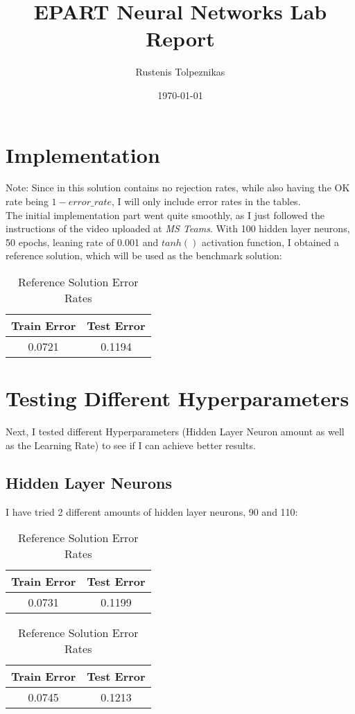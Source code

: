 \documentclass[
  a4paper,            %
  DIV=10,             %
  oneside,            %
  BCOR=5mm,           %
  parskip=half,       %
  numbers=noenddot,   %
  bibtotoc,           %
  listof=totoc,        %
  article
]{scrreprt}
\title{EPART Neural Networks Lab Report}
\author{Rustenis Tolpeznikas}
\date{\today}
\begin{document}
\maketitle
\newpage

\section{Implementation}
\small{Note: Since in this solution contains no rejection rates, while also having the OK rate being $1 - error\_rate$, I will only include error rates in the tables.}
\\
The initial implementation part went quite smoothly, as I just followed the instructions of the video uploaded at \textit{MS Teams}.
With 100 hidden layer neurons, 50 epochs, leaning rate of 0.001 and $tanh()$ activation function, I obtained a reference solution, which will be used as the benchmark solution:
\begin{table}[h!]
\centering
\begin{tabular}{|c|c|}
\hline
\textbf{Train Error} & \textbf{Test Error} \\
\hline
0.0721 & 0.1194 \\
\hline
\end{tabular}
\caption*{Reference Solution Error Rates}
\end{table}

\section{Testing Different Hyperparameters}
Next, I tested different Hyperparameters (Hidden Layer Neuron amount as well as the Learning Rate) to see if I can achieve better results.
\subsection{Hidden Layer Neurons}
I have tried 2 different amounts of hidden layer neurons, 90 and 110:
\begin{table}[h!]
  \centering
  \begin{tabular}{|c|c|}
  \hline
  \textbf{Train Error} & \textbf{Test Error} \\
  \hline
  0.0731 & 0.1199 \\
  \hline
  \end{tabular}
  \caption*{Reference Solution Error Rates}
  \end{table}
\begin{table}[h!]
  \centering
  \begin{tabular}{|c|c|}
  \hline
  \textbf{Train Error} & \textbf{Test Error} \\
  \hline
  0.0745 & 0.1213 \\
  \hline
  \end{tabular}
  \caption*{Reference Solution Error Rates}
  \end{table}
\end{document}
